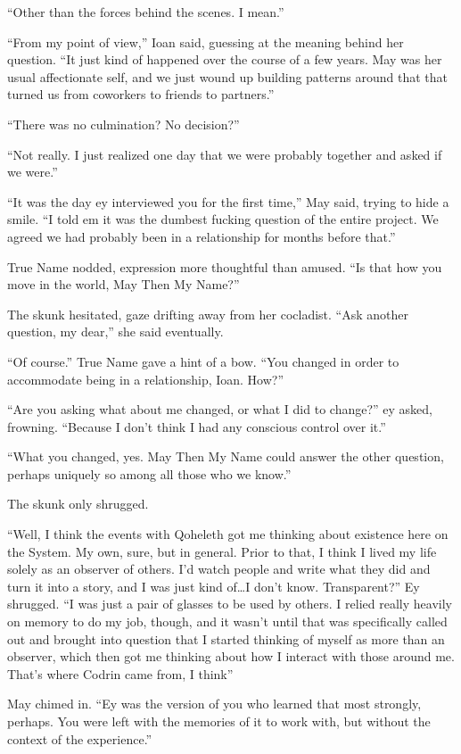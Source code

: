 ``Other than the forces behind the scenes. I mean.''

``From my point of view,'' Ioan said, guessing at the meaning behind her question. ``It just kind of happened over the course of a few years. May was her usual affectionate self, and we just wound up building patterns around that that turned us from coworkers to friends to partners.''

``There was no culmination? No decision?''

``Not really. I just realized one day that we were probably together and asked if we were.''

``It was the day ey interviewed you for the first time,'' May said, trying to hide a smile. ``I told em it was the dumbest fucking question of the entire project. We agreed we had probably been in a relationship for months before that.''

True Name nodded, expression more thoughtful than amused. ``Is that how you move in the world, May Then My Name?''

The skunk hesitated, gaze drifting away from her cocladist. ``Ask another question, my dear,'' she said eventually.

``Of course.'' True Name gave a hint of a bow. ``You changed in order to accommodate being in a relationship, Ioan. How?''

``Are you asking what about me changed, or what I did to change?'' ey asked, frowning. ``Because I don't think I had any conscious control over it.''

``What you changed, yes. May Then My Name could answer the other question, perhaps uniquely so among all those who we know.''

The skunk only shrugged.

``Well, I think the events with Qoheleth got me thinking about existence here on the System. My own, sure, but in general. Prior to that, I think I lived my life solely as an observer of others. I'd watch people and write what they did and turn it into a story, and I was just kind of\ldots I don't know. Transparent?'' Ey shrugged. ``I was just a pair of glasses to be used by others. I relied really heavily on memory to do my job, though, and it wasn't until that was specifically called out and brought into question that I started thinking of myself as more than an observer, which then got me thinking about how I interact with those around me. That's where Codrin came from, I think''

May chimed in. ``Ey was the version of you who learned that most strongly, perhaps. You were left with the memories of it to work with, but without the context of the experience.''

